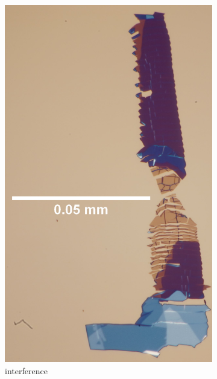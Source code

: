\begin{figure}[H]
    \centering
    \begin{subfigure}{0.3\textwidth}
        \centering
        \includegraphics[width=1.0\textwidth]{img/output_t1/M1_3_100_adj}
        \caption{interference}
	      \label{fig_mono_spec1_int}
    \end{subfigure}
    \begin{subfigure}{0.24\textwidth}
        \centering

\end{subfigure}
\end{figure}
